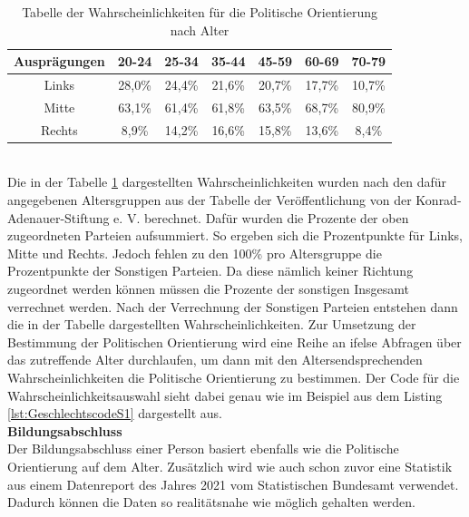 \begin{onehalfspace}
\begin{table}[!h]
    \centering
    \begin{tabular}{|c|c|c|c|c|c|c|}
    \hline
    \textbf{Ausprägungen} & \textbf{20-24} & \textbf{25-34} & \textbf{35-44} & \textbf{45-59} & \textbf{60-69} & \textbf{70-79} \\ \hline
    Links                 & 28,0\%         & 24,4\%         & 21,6\%         & 20,7\%         & 17,7\%         & 10,7\%         \\ \hline
    Mitte                 & 63,1\%         & 61,4\%         & 61,8\%         & 63,5\%         & 68,7\%         & 80,9\%         \\ \hline
    Rechts                & 8,9\%          & 14,2\%         & 16,6\%         & 15,8\%         & 13,6\%         & 8,4\%          \\ \hline
    \end{tabular}
    \caption{Tabelle der Wahrscheinlichkeiten für die Politische Orientierung nach Alter}
    \label{table:7}
\end{table}\\
Die in der Tabelle \ref{table:7} dargestellten Wahrscheinlichkeiten wurden nach den dafür angegebenen Altersgruppen aus der Tabelle der Veröffentlichung von der Konrad-Adenauer-Stiftung e. V. berechnet. Dafür wurden die Prozente der oben zugeordneten Parteien aufsummiert. So ergeben sich die Prozentpunkte für Links, Mitte und Rechts. Jedoch fehlen zu den 100\% pro Altersgruppe die Prozentpunkte der Sonstigen Parteien. Da diese nämlich keiner Richtung zugeordnet werden können müssen die Prozente der sonstigen Insgesamt verrechnet werden. Nach der Verrechnung der Sonstigen Parteien entstehen dann die in der Tabelle dargestellten Wahrscheinlichkeiten.\cite[S. 33]{konrad-adenauer-stiftung2021} Zur Umsetzung der Bestimmung der Politischen Orientierung wird eine Reihe an ifelse Abfragen über das zutreffende Alter durchlaufen, um dann mit den Altersendsprechenden Wahrscheinlichkeiten die Politische Orientierung zu bestimmen. Der Code für die Wahrscheinlichkeitsauswahl sieht dabei genau wie im Beispiel aus dem Listing \ref{lst:GeschlechtscodeS1} dargestellt aus.\\
\textbf{Bildungsabschluss}\\
Der Bildungsabschluss einer Person basiert ebenfalls wie die Politische Orientierung auf dem Alter. Zusätzlich wird wie auch schon zuvor eine Statistik aus einem Datenreport des Jahres 2021 vom Statistischen Bundesamt verwendet. \cite{destatis2021} Dadurch können die Daten so realitätsnahe wie möglich gehalten werden.\\ 

\end{onehalfspace}
